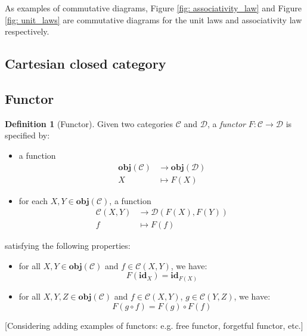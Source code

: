 \documentclass[12pt,twoside,a4paper]{report}
\theoremstyle{definition}
\newtheorem*{definition*}{Definition}
\begin{document}
        As examples of commutative diagrams, Figure \ref{fig: associativity_law} and Figure \ref{fig: unit_laws} are commutative diagrams for the unit laws and associativity law respectively. 

        \subsection{Cartesian closed category}
        \subsection{Functor}
        \begin{definition*}[Functor]
            Given two categories $\mathcal{C}$ and $\mathcal{D}$, a \emph{functor} $F: \mathcal{C} \to \mathcal{D}$ is specified by:
            \begin{itemize}
                \item 
                    a function 
                    \[\begin{aligned}
                        \textbf{obj}(\mathcal{C}) &\to \textbf{obj}(\mathcal{D}) \\
                        X &\mapsto F(X)
                    \end{aligned}\]

                \item 
                    for each $X, Y \in \textbf{obj}(\mathcal{C})$, a function 
                    \[\begin{aligned}
                        \mathcal{C}{(X,Y)} &\to \mathcal{D}{(F(X),F(Y))} \\
                        f &\mapsto F(f)
                    \end{aligned}\]
            \end{itemize}
            satisfying the following properties:
            \begin{itemize}
                \item 
                    for all $X, Y \in \textbf{obj}(\mathcal{C})$ and $f \in \mathcal{C}{(X,Y)}$, we have:
                    \begin{equation} \label{law: functor_id}
                        F(\textbf{id}_X) = \textbf{id}_{F(X)}
                    \end{equation}
                \item
                    for all $X, Y, Z \in \textbf{obj}(\mathcal{C})$ and $f \in \mathcal{C}{(X,Y)}$, $g \in \mathcal{C}{(Y,Z)}$, we have:
                    \begin{equation} \label{law: functor_comp}
                        F(g \circ f) = F(g) \circ F(f)
                    \end{equation}
            \end{itemize}
        \end{definition*}
        [Considering adding examples of functors: e.g. free functor, forgetful functor, etc.]
\end{document}
